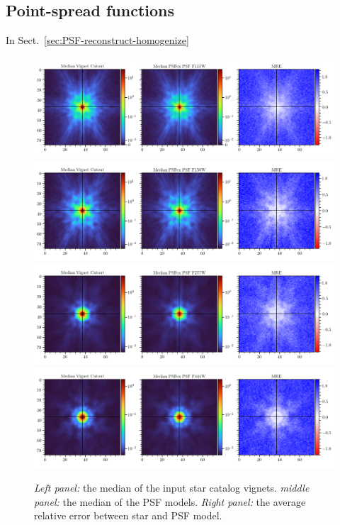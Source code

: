 \documentclass[longauth]{aa}
\begin{document}
\begin{appendix}

\section{Point-spread functions} \label{sec:appendix-psf}
In Sect.~\ref{sec:PSF-reconstruct-homogenize} 



\begin{figure}[ht!]
\centering
\includegraphics[width=0.99\columnwidth]{figures/ms_f115w_psfex.png}
\includegraphics[width=0.99\columnwidth]{figures/ms_f150w_psfex.png}
\includegraphics[width=0.99\columnwidth]{figures/ms_f277w_psfex.png}
\includegraphics[width=0.99\columnwidth]{figures/ms_f444w_psfex.png}
\caption{\textit{Left panel:} the median of the input star catalog vignets. \textit{middle panel:} the median of the PSF models. \textit{Right panel:} the average relative error between star and PSF model.}
\label{fig:psf-MRE}
\end{figure}



\end{appendix}
\end{document}
